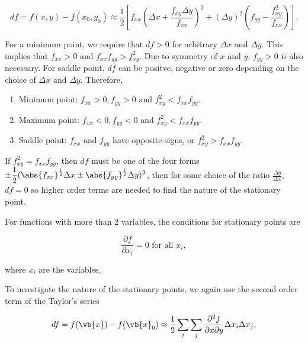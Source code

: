 \documentclass[english,a4paper,12pt]{report}
\begin{document}
\begin{equation}
    df = f(x,y) - f(x_0 , y_0 ) \approx  \frac{1}{2} \left[ f_{xx}\left( \Delta x+ \frac{f_{xy}\Delta y }{f_{xx} }  \right)^2 + (\Delta y)^2\left( f_{yy} - \frac{f_{xy}^2 }{f_{xx} }   \right)  \right].
\end{equation}

For a minimum point, we require that \(df>0\) for arbitrary \(\Delta x \text { and } \Delta y\). This implies that \(f_{xx} >0 \text { and }  f_{xx}f_{yy} > f_{xy}^2\). Due to symmetry of \(x \text { and } y\), \(f_{y y } >0\) is also necessary. For saddle point, \(df\) can be positve, negative or zero depending on the choice of \(\Delta x \text { and } \Delta y\). Therefore,

\begin{enumerate}
    \item Minimum point: \(f_{xx} > 0, f_{yy} > 0 \text { and } f_{xy}^2 < f_{xx}f_{yy}\).
    \item Maximum point: \(f_{xx} < 0, f_{yy} < 0 \text { and } f_{xy}^2 < f_{xx}f_{yy}\).
    \item Saddle point: \(f_{xx} \text { and } f_{yy}\) have opposite signs, or \(f_{xy}^2 > f_{xx}f_{yy}\). 
\end{enumerate}

If \(f_{xy}^2 = f_{xx}f_{yy}\), then \(df\) must be one of the four forms \(\displaystyle \pm \frac{1}{2} (\abs{f_{xx} }^{\frac{1}{2} } \Delta x \pm \abs{f_{yy} }^{\frac{1}{2} }\Delta y)^2\), then for some choice of the ratio \(\displaystyle \frac{\Delta y}{\Delta x}\), \(df = 0\) so higher order terms are needed to find the nature of the stationary point. 

For functions with more than 2 variables, the conditions for stationary points are 

\begin{equation}
    \frac{\partial f}{\partial x_{i} } = 0 \text{ for all }  x_{i},
\end{equation}

where \(x_{i} \) are the variables. 

To investigate the nature of the stationary points, we again use the second order term of the Taylor's series

\begin{equation}
    df = f(\vb{x} ) - f(\vb{x} _{0} ) \approx \frac{1}{2}\sum_{i} \sum_{j} \frac{\partial^2 f}{\partial x \partial y} \Delta x_{i}\Delta x_{j},      
\end{equation}
\end{document}
